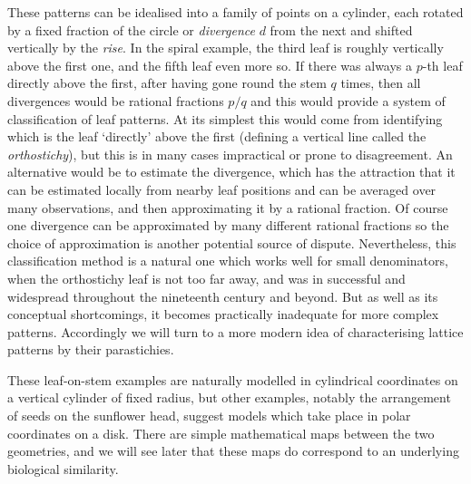 These patterns can be idealised into a family of points on a cylinder, each rotated by a fixed fraction of the circle or \emph{divergence} $d$ from the next and shifted vertically by the \emph{rise}. 
In the spiral example, the third leaf is roughly vertically above the first one, and the fifth leaf even more so. 
If there was always a $p$-th leaf directly above the first, after having gone round the stem $q$ times, then all divergences would be rational fractions $p/q$  and this would provide a system of classification of leaf patterns. At its simplest this would come from identifying which is the leaf `directly' above the first (defining a vertical line called the \emph{orthostichy}), but this is in many cases impractical or 
prone to disagreement. An alternative would be to estimate the divergence, which has the attraction that it can be estimated locally from nearby leaf positions and can be averaged over many observations, and 
then approximating it by a rational fraction. Of course one divergence can be approximated by many different rational fractions so the choice of approximation is another potential source of dispute.
Nevertheless, this classification method is a natural one which works well for small denominators,  when the orthostichy leaf is not too far away, and was in successful and widespread throughout the nineteenth century and beyond. But as well as its conceptual shortcomings, it becomes practically inadequate for more complex patterns. Accordingly we will turn to a more modern idea of characterising lattice patterns by their parastichies.


These leaf-on-stem examples are naturally modelled in cylindrical coordinates on a vertical cylinder of fixed radius, but other examples, notably the arrangement of seeds on the sunflower head, suggest models which take place in polar coordinates on a disk. There are simple mathematical maps between the two geometries, and we will see later that these maps do correspond to an underlying biological similarity.%




